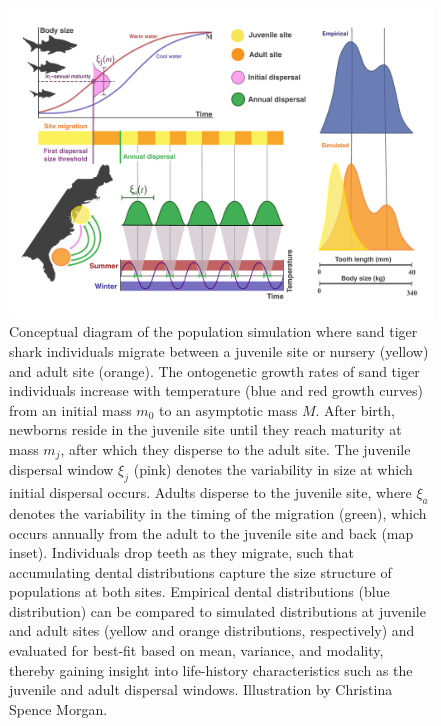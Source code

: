\documentclass[]{rsos}%
\begin{document}
\begin{figure}[ht]
  \centering
  \includegraphics[width=1\linewidth]{BodySizeFigure_Draft2_Jan6.pdf}  
   \caption{Conceptual diagram of the population simulation where sand tiger shark individuals migrate between a juvenile site or nursery (yellow) and adult site (orange). 
   The ontogenetic growth rates of sand tiger individuals increase with temperature (blue and red growth curves) from an initial mass $m_0$ to an asymptotic mass $M$.
   After birth, newborns reside in the juvenile site until they reach maturity at mass $m_j$, after which they disperse to the adult site.
   The juvenile dispersal window $\xi_j$ (pink) denotes the variability in size at which initial dispersal occurs. 
   Adults disperse to the juvenile site, where $\xi_a$ denotes the variability in the timing of the migration (green), which occurs annually from the adult to the juvenile site and back (map inset).
   Individuals drop teeth as they migrate, such that accumulating dental distributions capture the size structure of populations at both sites.
   Empirical dental distributions (blue distribution) can be compared to simulated distributions at juvenile and adult sites (yellow and orange distributions, respectively) and evaluated for best-fit based on mean, variance, and modality, thereby gaining insight into life-history characteristics such as the juvenile and adult dispersal windows. Illustration by Christina Spence Morgan.}
  \label{fig:diagram}
\end{figure}
\end{document}
